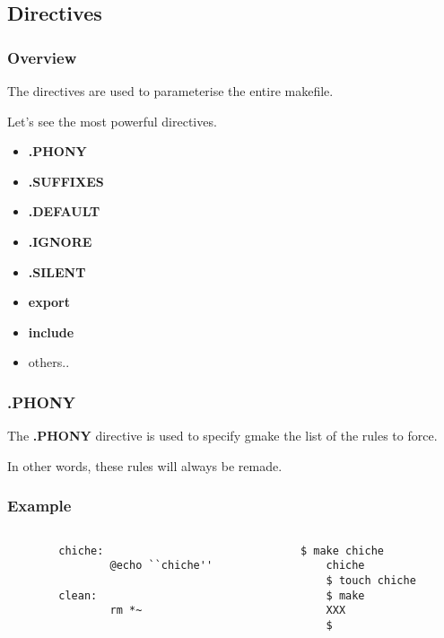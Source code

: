 %
%

\subsection{Directives}


\begin{frame}
  \frametitle{Overview}

  The directives are used to parameterise the entire makefile.

  \nl

  Let's see the most powerful directives.

  \begin{itemize}[<+->]
    \item
      \textbf{.PHONY}
    \item
      \textbf{.SUFFIXES}
    \item
      \textbf{.DEFAULT}
    \item
      \textbf{.IGNORE}
    \item
      \textbf{.SILENT}
    \item
      \textbf{export}
    \item
      \textbf{include}
    \item
      others..
  \end{itemize}
\end{frame}


\begin{frame}
  \frametitle{\textbf{.PHONY}}

  The \textbf{.PHONY} directive is used to specify gmake the list of the
  rules to force.

  \nl

  In other words, these rules will always be remade.
\end{frame}


\begin{frame}[containsverbatim]
  \frametitle{Example}

  \begin{columns}{2}

    \begin{column}{6cm}
      \begin{verbatim}
        chiche:
                @echo ``chiche''

        clean:
                rm *~
      \end{verbatim}
    \end{column}

    \begin{column}{6cm}
      \begin{verbatim}
	$ make chiche
        chiche
        $ touch chiche
        $ make
        XXX
        $ 
      \end{verbatim}
    \end{column}

  \end{columns}
\end{frame}

